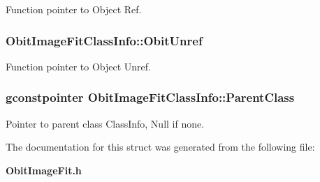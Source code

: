 Function pointer to Object Ref. 

\subsubsection{ {\bf Obit\-Image\-Fit\-Class\-Info::Obit\-Unref}}\label{structObitImageFitClassInfo_o11}


Function pointer to Object Unref. 

\subsubsection{\setlength{\rightskip}{0pt plus 5cm}gconstpointer {\bf Obit\-Image\-Fit\-Class\-Info::Parent\-Class}}\label{structObitImageFitClassInfo_o3}


Pointer to parent class Class\-Info, Null if none. 



The documentation for this struct was generated from the following file:\begin{CompactItemize}
\item 
{\bf Obit\-Image\-Fit.h}\end{CompactItemize}
